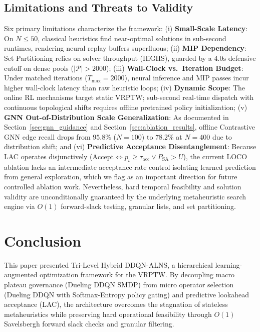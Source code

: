 \documentclass{ieeeaccess}
\begin{document}
\subsection{Limitations and Threats to Validity}
\label{sec:disc_limitations}
Six primary limitations characterize the framework: (i) \textbf{Small-Scale Latency}: On $N \le 50$, classical heuristics find near-optimal solutions in sub-second runtimes, rendering neural replay buffers superfluous; (ii) \textbf{MIP Dependency}: Set Partitioning relies on solver throughput (HiGHS), guarded by a $4.0\text{s}$ defensive cutoff on dense pools ($|\mathcal{P}| > 2000$); (iii) \textbf{Wall-Clock vs.\ Iteration Budget}: Under matched iterations ($T_{\max} = 2000$), neural inference and MIP passes incur higher wall-clock latency than raw heuristic loops; (iv) \textbf{Dynamic Scope}: The online RL mechanisms target static VRPTW; sub-second real-time dispatch with continuous topological shifts requires offline pretrained policy initialization; (v) \textbf{GNN Out-of-Distribution Scale Generalization}: As documented in Section~\ref{sec:gnn_guidance} and Section~\ref{sec:ablation_results}, offline Contrastive GNN edge recall drops from $95.8\%$ ($N=100$) to $78.2\%$ at $N=400$ due to distribution shift; and (vi) \textbf{Predictive Acceptance Disentanglement}: Because LAC operates disjunctively ($\text{Accept} \iff p_t \ge \tau_{\text{acc}} \lor P_{\text{SA}} > U$), the current LOCO ablation lacks an intermediate acceptance-rate control isolating learned prediction from general exploration, which we flag as an important direction for future controlled ablation work. Nevertheless, hard temporal feasibility and solution validity are unconditionally guaranteed by the underlying metaheuristic search engine via $O(1)$ forward-slack testing, granular lists, and set partitioning.

\section{Conclusion}
\label{sec:conclusion}
This paper presented Tri-Level Hybrid DDQN-ALNS, a hierarchical learning-augmented optimization framework for the VRPTW. By decoupling macro plateau governance (Dueling DDQN SMDP) from micro operator selection (Dueling DDQN with Softmax-Entropy policy gating) and predictive lookahead acceptance (LAC), the architecture overcomes the stagnation of stateless metaheuristics while preserving hard operational feasibility through $O(1)$ Savelsbergh forward slack checks and granular filtering. 
\end{document}
